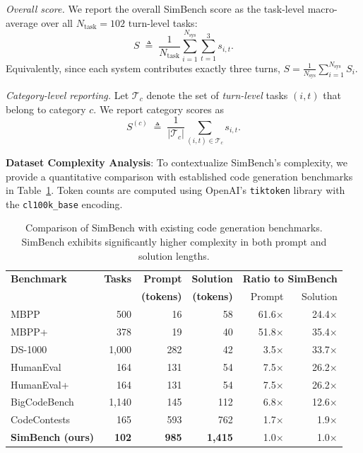 \noindent\emph{Overall score.}
We report the overall SimBench score as the task-level macro-average over all $N_{\text{task}}=102$ turn-level tasks:
\begin{equation}
S \;\triangleq\; \frac{1}{N_{\text{task}}}\sum_{i=1}^{N_{\text{sys}}}\sum_{t=1}^{3} s_{i,t}.
\label{eq:overall_agg}
\end{equation}
Equivalently, since each system contributes exactly three turns, $S = \frac{1}{N_{\text{sys}}}\sum_{i=1}^{N_{\text{sys}}} S_i$.

\vspace{2pt}
\noindent\emph{Category-level reporting.}
Let $\mathcal{T}_c$ denote the set of \emph{turn-level} tasks $(i,t)$ that belong to category $c$. We report category scores as
\begin{equation}
S^{(c)} \;\triangleq\; \frac{1}{|\mathcal{T}_c|}\sum_{(i,t)\in\mathcal{T}_c} s_{i,t}.
\label{eq:cat_agg}
\end{equation}

{\noindent\textbf{Dataset Complexity Analysis}}: To contextualize SimBench's complexity, we provide a quantitative comparison with established code generation benchmarks in Table~\ref{tab:benchmark_comparison}. Token counts are computed using OpenAI's \texttt{tiktoken} library with the \texttt{cl100k\_base} encoding.

\begin{table}[h!]
    \centering
    \caption{Comparison of SimBench with existing code generation benchmarks. SimBench exhibits significantly higher complexity in both prompt and solution lengths.}
    \label{tab:benchmark_comparison}
    \begin{tabular}{l r r r r r}
        \toprule
        \textbf{Benchmark} & \textbf{Tasks} & \textbf{Prompt} & \textbf{Solution} & \multicolumn{2}{c}{\textbf{Ratio to SimBench}} \\
        & & \textbf{(tokens)} & \textbf{(tokens)} & Prompt & Solution \\
        \midrule
        MBPP~\cite{austin2021program} & 500 & 16 & 58 & 61.6$\times$ & 24.4$\times$ \\
        MBPP+~\cite{liu2024your} & 378 & 19 & 40 & 51.8$\times$ & 35.4$\times$ \\
        DS-1000~\cite{lai2023ds} & 1,000 & 282 & 42 & 3.5$\times$ & 33.7$\times$ \\
        HumanEval~\cite{chen2021evaluating} & 164 & 131 & 54 & 7.5$\times$ & 26.2$\times$ \\
        HumanEval+~\cite{liu2024your} & 164 & 131 & 54 & 7.5$\times$ & 26.2$\times$ \\
        BigCodeBench~\cite{zhuo2024bigcodebench} & 1,140 & 145 & 112 & 6.8$\times$ & 12.6$\times$ \\
        CodeContests~\cite{li2022competition} & 165 & 593 & 762 & 1.7$\times$ & 1.9$\times$ \\
        \midrule
        \textbf{SimBench (ours)} & \textbf{102} & \textbf{985} & \textbf{1,415} & 1.0$\times$ & 1.0$\times$ \\
        \bottomrule
    \end{tabular}
\end{table}

